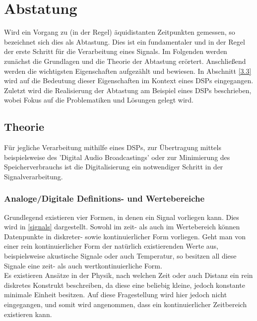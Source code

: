 \section{Abstatung}\label{3}
Wird ein Vorgang zu (in der Regel) äquidistanten Zeitpunkten gemessen, so bezeichnet sich dies als Abtastung. Dies ist ein fundamentaler und in der Regel der erste Schritt für die Verarbeitung eines Signals. Im Folgenden werden zunächst die Grundlagen und die Theorie der Abtastung erörtert. Anschließend werden die wichtigsten Eigenschaften aufgezählt und bewiesen. In Abschnitt \ref{3.3} wird auf die Bedeutung dieser Eigenschaften im Kontext eines DSPs eingegangen. Zuletzt wird die Realisierung der Abtastung am Beispiel eines DSPs beschrieben, wobei Fokus auf die Problematiken und Lösungen gelegt wird.
\subsection{Theorie}\label{3.1}
Für jegliche Verarbeitung mithilfe eines DSPs, zur Übertragung mittels beispielsweise des 'Digital Audio Broadcastings' oder zur Minimierung des Speicherverbrauchs ist die Digitalisierung ein notwendiger Schritt in der Signalverarbeitung. 

\subsubsection{Analoge/Digitale Definitions- und Wertebereiche}
Grundlegend existieren vier Formen, in denen ein Signal vorliegen kann. Dies wird in \ref{signals} dargestellt. Sowohl im zeit- als auch im Wertebereich können Datenpunkte in diskreter- sowie kontinuierlicher Form vorliegen. Geht man von einer rein kontinuierlicher Form der natürlich existierenden Werte aus, beispielsweise akustische Signale oder auch Temperatur, so besitzen all diese Signale eine zeit- als auch wertkontinuierliche Form.\\
Es existieren Ansätze in der Physik, nach welchen Zeit oder auch Distanz ein rein diskretes Konstrukt beschreiben, da diese eine beliebig kleine, jedoch konstante minimale Einheit besitzen. Auf diese Fragestellung wird hier jedoch nicht eingegangen, und somit wird angenommen, dass ein kontinuierlicher Zeitbereich existieren kann.\\
\newpage

